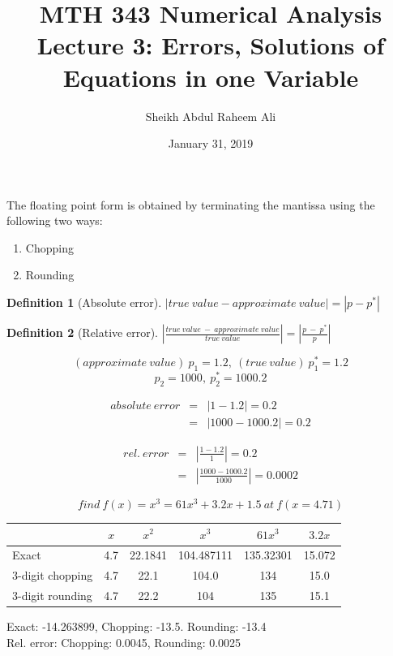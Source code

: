 \documentclass[]{article}
\title{MTH 343 Numerical Analysis Lecture 3: Errors, Solutions of Equations in one Variable}
\author{Sheikh Abdul Raheem Ali}
\date{January 31, 2019}
\newtheorem{Def}{Definition}
\begin{document}
\maketitle

The floating point form is obtained by terminating the mantissa using the following two ways:

\begin{enumerate}
	\item Chopping
	\item Rounding
\end{enumerate}

\begin{Def}[Absolute error]
$	|true \ value - approximate \ value| = |p - p^*| $
\end{Def}

\begin{Def}[Relative error]
$ |\frac{true \ value \ - \ approximate \ value}{true \ value}| =  |\frac{p \ - \ p^*}{p}| $
\end{Def}

\[  (approximate \ value ) \ p_1 = 1.2, \ (true \ value) \ p_1^* = 1.2 \]
\[  p_2 = 1000, \ p_2^* = 1000.2 \]

\begin{eqnarray}
absolute \ error &=&  |1 - 1.2| = 0.2 \nonumber \\
&=& |1000 - 1000.2| = 0.2 \nonumber
\end{eqnarray}

\begin{eqnarray}
	rel. \ error &=& |\frac{1 - 1.2}{1}| = 0.2 \nonumber \\
	&=&  |\frac{1000 - 1000.2}{1000}| = 0.0002 \nonumber 
\end{eqnarray}

\[ find \ f(x) = x^3 = 61x^3 + 3.2x + 1.5 \ at \ f(x = 4.71) \]

\begin{tabular}{l c c c c c}
	& $ x $ & $ x^2 $ & $ x^3 $ & $ 61x^3 $ & $ 3.2x $ \\ \hline
	Exact &4.7&22.1841&104.487111&135.32301&15.072\\
	3-digit chopping &4.7&22.1&104.0&134&15.0 \\
	3-digit rounding &4.7&22.2&104&135&15.1 \\
	
\end{tabular}

Exact: -14.263899, Chopping: -13.5. Rounding: -13.4 \\
Rel. error: Chopping: 0.0045, Rounding: 0.0025
\end{document}
